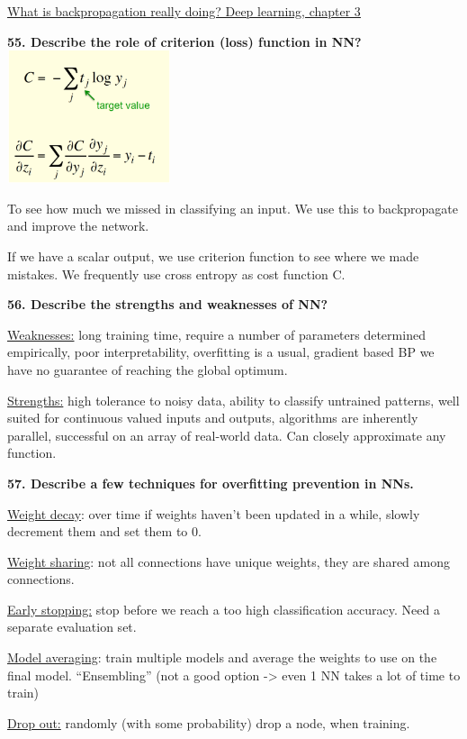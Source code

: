 \href{https://www.youtube.com/watch?v=Ilg3gGewQ5U}{\underline{What is
backpropagation really doing? \textbar{} Deep learning, chapter 3}}

\textbf{55. Describe the role of criterion (loss) function in
NN?}\includegraphics[width=1.89421in,height=1.53125in]{media/image32.png}

To see how much we missed in classifying an input. We use this to
backpropagate and improve the network.

If we have a scalar output, we use criterion function to see where we
made mistakes. We frequently use cross entropy as cost function C.

\textbf{56. Describe the strengths and weaknesses of NN?}

\underline{Weaknesses:} long training time, require a number of
parameters determined empirically, poor interpretability, overfitting is
a usual, gradient based BP we have no guarantee of reaching the global
optimum.

\underline{Strengths:} high tolerance to noisy data, ability to classify
untrained patterns, well suited for continuous valued inputs and
outputs, algorithms are inherently parallel, successful on an array of
real-world data. Can closely approximate any function.

\textbf{57. Describe a few techniques for overfitting prevention in
NNs.}

\underline{Weight decay}: over time if weights haven't been updated in a
while, slowly decrement them and set them to 0.

\underline{Weight sharin}g: not all connections have unique weights,
they are shared among connections.

\underline{Early stopping:} stop before we reach a too high
classification accuracy. Need a separate evaluation set.

\underline{Model averaging}: train multiple models and average the
weights to use on the final model. ``Ensembling'' (not a good option
-\textgreater{} even 1 NN takes a lot of time to train)

\underline{Drop out:} randomly (with some probability) drop a node, when
training.

